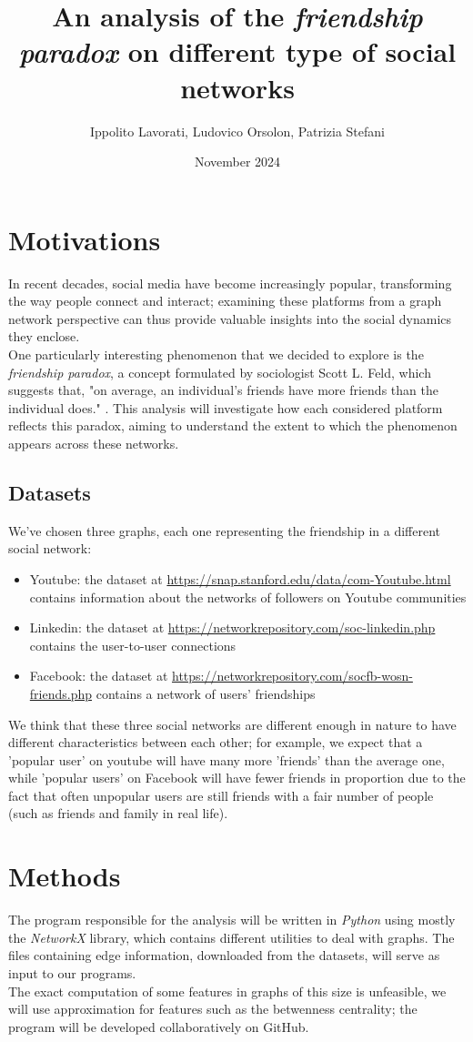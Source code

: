\documentclass{article}
\title{An analysis of the \textit{friendship paradox} on different type of social networks}
\author{Ippolito Lavorati, Ludovico Orsolon, Patrizia Stefani}
\date{November 2024}
\begin{document}
\maketitle
\section{Motivations}
In recent decades, social media have become increasingly popular, transforming the way people connect and interact; examining these platforms from a graph network perspective can thus provide valuable insights into the social dynamics they enclose.\\
One particularly interesting phenomenon that we decided to explore is the \textit{friendship paradox}, a concept formulated by sociologist Scott L. Feld, which suggests that, "on average, an individual's friends have more friends than the individual does." \cite{friendship_paradox}.
This analysis will investigate how each considered platform reflects this paradox, aiming to understand the extent to which the phenomenon appears across these networks.

\subsection{Datasets}
We’ve chosen three graphs, each one representing the friendship in a different social network:
\begin{itemize}
    \item Youtube: the dataset at \url{https://snap.stanford.edu/data/com-Youtube.html} contains information about the networks of followers on Youtube communities 
    \item Linkedin: the dataset at \url{https://networkrepository.com/soc-linkedin.php} contains the user-to-user connections
    \item Facebook: the dataset at \url{https://networkrepository.com/socfb-wosn-friends.php} contains a network of users' friendships
\end{itemize}
We think that these three social networks are different enough in nature to have different characteristics between each other; for example, we expect that a 'popular user' on youtube will have many more 'friends' than the average one, while 'popular users' on Facebook will have fewer friends in proportion due to the fact that often unpopular users are still friends with a fair number of people (such as friends and family in real life).

\section{Methods}
The program responsible for the analysis will be written in \textit{Python} using mostly the \textit{NetworkX} library, which contains different utilities to deal with graphs. The files containing edge information, downloaded from the datasets, will serve as input to our programs. \\
The exact computation of some features in graphs of this size is unfeasible, we will use approximation for features such as the betwenness centrality; the program will be developed collaboratively on GitHub.
\end{document}
